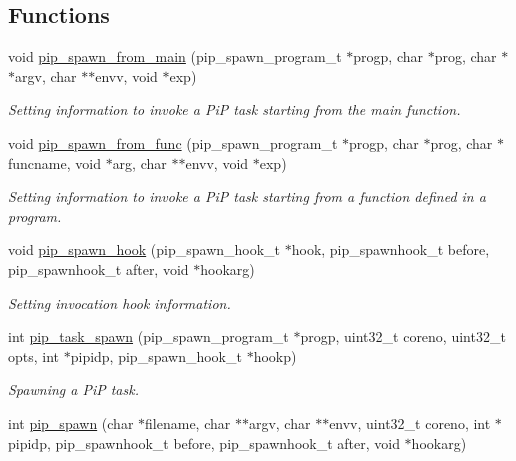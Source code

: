 \documentclass[twoside]{book}
\begin{document}
\subsection*{Functions}
\begin{DoxyCompactItemize}
\item 
void \hyperlink{group__pip-1-spawn_ga0b1e746befd27c418355d28a830b2db6}{pip\-\_\-spawn\-\_\-from\-\_\-main} (pip\-\_\-spawn\-\_\-program\-\_\-t $\ast$progp, char $\ast$prog, char $\ast$$\ast$argv, char $\ast$$\ast$envv, void $\ast$exp)
\begin{DoxyCompactList}\small\item\em Setting information to invoke a Pi\-P task starting from the main function. \end{DoxyCompactList}\item 
void \hyperlink{group__pip-1-spawn_ga6ebadd5070ca345daf8d7465f4926fc0}{pip\-\_\-spawn\-\_\-from\-\_\-func} (pip\-\_\-spawn\-\_\-program\-\_\-t $\ast$progp, char $\ast$prog, char $\ast$funcname, void $\ast$arg, char $\ast$$\ast$envv, void $\ast$exp)
\begin{DoxyCompactList}\small\item\em Setting information to invoke a Pi\-P task starting from a function defined in a program. \end{DoxyCompactList}\item 
void \hyperlink{group__pip-1-spawn_ga1c3f1d9e029f68dbcfb7d78b7dfa1533}{pip\-\_\-spawn\-\_\-hook} (pip\-\_\-spawn\-\_\-hook\-\_\-t $\ast$hook, pip\-\_\-spawnhook\-\_\-t before, pip\-\_\-spawnhook\-\_\-t after, void $\ast$hookarg)
\begin{DoxyCompactList}\small\item\em Setting invocation hook information. \end{DoxyCompactList}\item 
int \hyperlink{group__pip-1-spawn_gaf1fcc4cb85ec3eda734afe2beb0c6a36}{pip\-\_\-task\-\_\-spawn} (pip\-\_\-spawn\-\_\-program\-\_\-t $\ast$progp, uint32\-\_\-t coreno, uint32\-\_\-t opts, int $\ast$pipidp, pip\-\_\-spawn\-\_\-hook\-\_\-t $\ast$hookp)
\begin{DoxyCompactList}\small\item\em Spawning a Pi\-P task. \end{DoxyCompactList}\item 
int \hyperlink{group__pip-1-spawn_ga4698d85283b03f0443fb0991e1119d35}{pip\-\_\-spawn} (char $\ast$filename, char $\ast$$\ast$argv, char $\ast$$\ast$envv, uint32\-\_\-t coreno, int $\ast$pipidp, pip\-\_\-spawnhook\-\_\-t before, pip\-\_\-spawnhook\-\_\-t after, void $\ast$hookarg)
$$
\end{DoxyCompactItemize}
\end{document}
